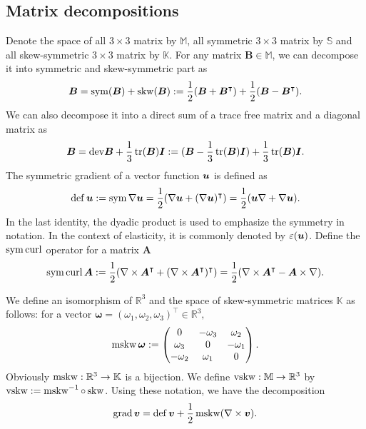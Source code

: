 \subsection{Matrix decompositions}
Denote the space of all  $3\times3$ matrix by $\mathbb{M}$, all symmetric $3\times3$ matrix by $\mathbb{S}$ and all skew-symmetric $3\times3$ matrix by $\mathbb{K}$. 
For any matrix $\boldsymbol  B\in \mathbb M$, we can decompose it into symmetric and skew-symmetric part as
$$
\boldsymbol  B = {\rm sym}(\boldsymbol  B) + {\rm skw}(\boldsymbol  B):= \frac{1}{2}(\boldsymbol  B + \boldsymbol  B^{\intercal}) + \frac{1}{2}(\boldsymbol  B - \boldsymbol  B^{\intercal}).
$$
We can also decompose it into a direct sum of a trace free matrix and a diagonal matrix as
\begin{equation}\label{eq:devtr}
\boldsymbol B = {\rm dev} \boldsymbol B + \frac{1}{3}\operatorname*{tr}(\boldsymbol B)\boldsymbol I := (\boldsymbol B - \frac{1}{3}\operatorname*{tr}(\boldsymbol B)\boldsymbol I) + \frac{1}{3}\operatorname*{tr}(\boldsymbol B)\boldsymbol I.
\end{equation}
The symmetric gradient of a vector function $\boldsymbol u$ is defined as
$$
\operatorname{def} \boldsymbol  u := \operatorname{sym} \nabla \boldsymbol  u = \frac{1}{2}(\nabla \boldsymbol  u + (\nabla \boldsymbol  u)^{\intercal}) = \frac{1}{2}(\boldsymbol  u\nabla + \nabla \boldsymbol  u) .
$$
In the last identity, the dyadic product is used to emphasize the symmetry in notation. In the context of elasticity, it is commonly denoted by $\varepsilon (\boldsymbol u)$.
Define the $\operatorname{sym}\operatorname{curl}$ operator for a matrix $\boldsymbol A$
$$
\operatorname{sym}\operatorname{curl} \boldsymbol A := \frac{1}{2}( \nabla \times \boldsymbol A^{\intercal} + (\nabla \times \boldsymbol A^{\intercal})^{\intercal}) = \frac{1}{2}( \nabla \times \boldsymbol A^{\intercal} - \boldsymbol A\times\nabla ).
$$

We define an isomorphism of $\mathbb R^3$ and the space of skew-symmetric matrices $\mathbb K$ as follows: for a vector $\boldsymbol  \omega =
( \omega_1, \omega_2, \omega_3)^{\intercal}
\in \mathbb R^3,$
\begin{equation*}%
\mskw \boldsymbol  \omega :=  
\begin{pmatrix}
 0 & -\omega_3 & \omega_2 \\
\omega_3 & 0 & - \omega_1\\
-\omega_2 & \omega_1 & 0
\end{pmatrix}. %
\end{equation*}
Obviously $\operatorname{mskw}: \mathbb R^3 \to \mathbb K$ is a bijection. We define $\operatorname{vskw}: \mathbb M\to \mathbb R^3$ by $\operatorname{vskw} := \operatorname{mskw}^{-1}\circ \operatorname{skw}$. Using these notation, we have the decomposition
\begin{equation}
\label{eq:du} \operatorname{grad} \boldsymbol  v =\operatorname{def}\boldsymbol  v+\frac{1}{2}\operatorname{mskw}(\nabla\times\boldsymbol  v).
\end{equation}

